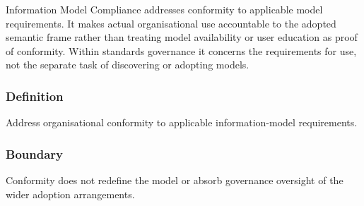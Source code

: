Information Model Compliance addresses conformity to applicable model requirements. It makes actual organisational use accountable to the adopted semantic frame rather than treating model availability or user education as proof of conformity. Within standards governance it concerns the requirements for use, not the separate task of discovering or adopting models.

\subsubsection*{Definition}

Address organisational conformity to applicable information-model requirements.

\subsubsection*{Boundary}

Conformity does not redefine the model or absorb governance oversight of the wider adoption arrangements.

